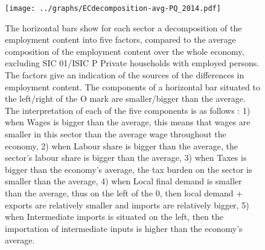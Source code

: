 \documentclass[12pt,english]{article}
\begin{document}


\begin{figure}[!ht]
	\centering
	\texttt{[image: ../graphs/ECdecomposition-avg-PQ\_2014.pdf]}
	\caption{\footnotesize \label{Decomposition_PQ}The horizontal bars show for each sector a decomposition of the employment content into five factors, compared to the average composition of the employment content over the whole economy, excluding SIC 01/ISIC P Private households with employed persons. The factors give an indication of the sources of the differences in employment content. The components of a horizontal bar situated to the left/right of the O mark are smaller/bigger than the average. The interpretation of each of the five components is as follows : 1) when Wages is bigger than the average, this means that wages are smaller in this sector than the average wage throughout the economy, 2) when Labour share is bigger than the average, the sector's labour share is bigger than the average, 3) when Taxes is bigger than the economy's average, the tax burden on the sector is smaller than the average, 4) when Local final demand is smaller than the average, thus on the left of the 0, then local demand + exports are relatively smaller and imports are relatively bigger, 5) when Intermediate imports is situated on the left, then the importation of intermediate inputs is higher than the economy's average.}
\end{figure}	
\end{document}
